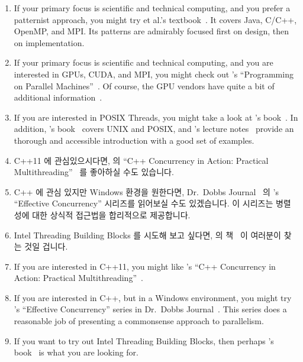 \begin{enumerate}
\item	If your primary focus is scientific and technical computing,
	and you prefer a patternist approach,
	you might try  et al.'s
	textbook~\cite{Mattson2005Textbook}.
	It covers Java, C/C++, OpenMP, and MPI\@.
	Its patterns are admirably focused first on design,
	then on implementation.
\item	If your primary focus is scientific and technical computing,
	and you are interested in GPUs, CUDA, and MPI, you
	might check out 's ``Programming on
	Parallel Machines''~\cite{NormMatloff2017ParProcBook}.
	Of course, the GPU vendors have quite a bit of additional
	information~\cite{AMD2020ROCm,CyrilZeller2011GPGPUbasics,NVidia2017GPGPU,NVidia2017GPGPU-university}.
\item	If you are interested in POSIX Threads, you might take
	a look at 's book~\cite{Butenhof1997pthreads}.
	In addition,
	's book~\cite{WRichardStevens1992,WRichardStevens2013}
	covers UNIX and POSIX, and 's lecture
	notes~\cite{StewartWeiss2013UNIX} provide an
	thorough and accessible introduction with a good set of
	examples.

\fi

\item	C++11 에 관심있으시다면,
	 의 ``C++ Concurrency in Action: Practical
	Multithreading''~\cite{AnthonyWilliams2012,AnthonyWilliams2019} 를
	좋아하실 수도 있습니다.
\item	C++ 에 관심 있지만 Windows 환경을 원한다면, 
	Dr.~Dobbs Journal~\cite{HerbSutter2008EffectiveConcurrency} 의
	's ``Effective Concurrency'' 시리즈를 읽어보실 수도
	있겠습니다.
	이 시리즈는 병렬성에 대한 상식적 접근법을 합리적으로 제공합니다.
\item	Intel Threading Building Blocks 를 시도해 보고 싶다면,
	 의 책~\cite{Reinders2007Textbook} 이 여러분이
	찾는 것일 겁니다.

\iffalse

\item	If you are interested in C++11, you might like
	's ``C++ Concurrency in Action: Practical
	Multithreading''~\cite{AnthonyWilliams2012,AnthonyWilliams2019}.
\item	If you are interested in C++, but in a Windows environment,
	you might try 's ``Effective Concurrency''
	series in
	Dr.~Dobbs Journal~\cite{HerbSutter2008EffectiveConcurrency}.
	This series does a reasonable job of presenting a
	commonsense approach to parallelism.
\item	If you want to try out Intel Threading Building Blocks,
	then perhaps 's book~\cite{Reinders2007Textbook}
	is what you are looking for.


\end{enumerate}
